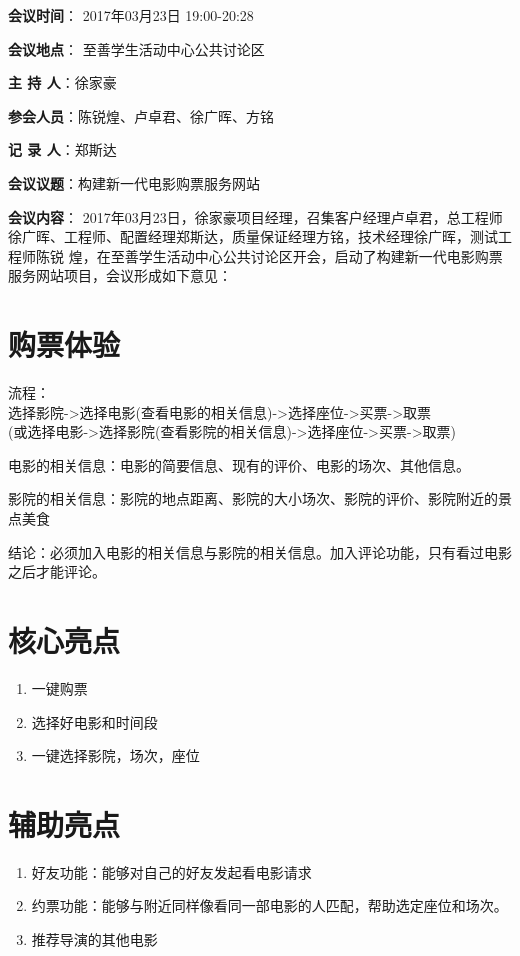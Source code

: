 \documentclass[12pt,twoside]{article}
\begin{document}
\begin{flushleft}
\large
  {\bf 会议时间}： 2017年03月23日 19:00-20:28

\par {\bf 会议地点}： 至善学生活动中心公共讨论区
\par {\bf 主 持 人}：徐家豪
\par {\bf 参会人员}：陈锐煌、卢卓君、徐广晖、方铭
\par {\bf 记 录 人}：郑斯达
\par {\bf 会议议题}：构建新一代电影购票服务网站
\par {\bf 会议内容}：
2017年03月23日，徐家豪项目经理，召集客户经理卢卓君，总工程师徐广晖、工程师、配置经理郑斯达，质量保证经理方铭，技术经理徐广晖，测试工程师陈锐
煌，在至善学生活动中心公共讨论区开会，启动了构建新一代电影购票服务网站项目，会议形成如下意见：
\end{flushleft}

\section{购票体验}
流程：\\
选择影院->选择电影(查看电影的相关信息)->选择座位->买票->取票\\
(或选择电影->选择影院(查看影院的相关信息)->选择座位->买票->取票)
\par
电影的相关信息：电影的简要信息、现有的评价、电影的场次、其他信息。
\par
影院的相关信息：影院的地点距离、影院的大小场次、影院的评价、影院附近的景点美食
\par
结论：必须加入电影的相关信息与影院的相关信息。加入评论功能，只有看过电影之后才能评论。
\section{核心亮点}
\begin{enumerate}
  \item 一键购票
  \item 选择好电影和时间段
  \item 一键选择影院，场次，座位
\end{enumerate}

\section{辅助亮点}

\begin{enumerate}
  \item 好友功能：能够对自己的好友发起看电影请求
  \item 约票功能：能够与附近同样像看同一部电影的人匹配，帮助选定座位和场次。
  \item 推荐导演的其他电影
\end{enumerate}
\end{document}
